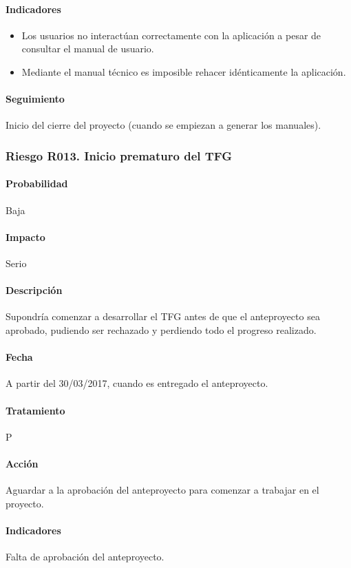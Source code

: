\documentclass[10pt,a4paper]{article}
\begin{document}
				\paragraph{Indicadores} 
				\begin{itemize}
				    \item Los usuarios no interactúan correctamente con la aplicación a pesar de consultar el manual de usuario.
				    \item Mediante el manual técnico es imposible rehacer idénticamente la aplicación.
				\end{itemize}				 
				\paragraph{Seguimiento}	Inicio del cierre del proyecto (cuando se empiezan a generar los manuales).
				
			\subsubsection{Riesgo R013. Inicio prematuro del TFG}
				\paragraph{Probabilidad} Baja
				\paragraph{Impacto}	Serio
				\paragraph{Descripción} Supondría comenzar a desarrollar el TFG antes de que el anteproyecto sea aprobado, pudiendo ser rechazado y perdiendo todo el progreso realizado.
				\paragraph{Fecha} A partir del 30/03/2017, cuando es entregado el anteproyecto.
				\paragraph{Tratamiento} P
				\paragraph{Acción} Aguardar a la aprobación del anteproyecto para comenzar a trabajar en el proyecto.
				\paragraph{Indicadores} Falta de aprobación del anteproyecto.
\end{document}
